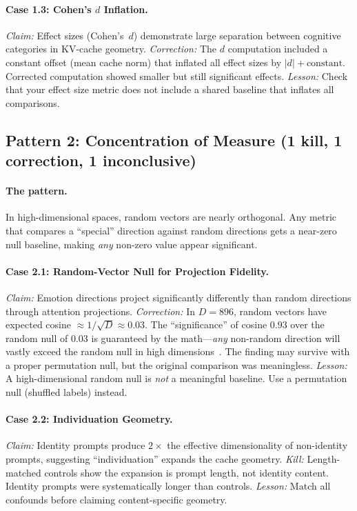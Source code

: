\documentclass[11pt,a4paper]{article}
\begin{document}
\paragraph{Case 1.3: Cohen's $d$ Inflation.}
\emph{Claim:} Effect sizes (Cohen's~$d$) demonstrate large separation
between cognitive categories in KV-cache geometry.
\emph{Correction:} The $d$ computation included a constant offset (mean cache
norm) that inflated all effect sizes by $|d| + \text{constant}$.
Corrected computation showed smaller but still significant effects.
\emph{Lesson:} Check that your effect size metric does not include a
shared baseline that inflates all comparisons.

\subsection{Pattern 2: Concentration of Measure (1 kill, 1 correction, 1 inconclusive)}

\paragraph{The pattern.} In high-dimensional spaces, random vectors are
nearly orthogonal. Any metric that compares a ``special'' direction
against random directions gets a near-zero null baseline, making
\emph{any} non-zero value appear significant.

\paragraph{Case 2.1: Random-Vector Null for Projection Fidelity.}
\emph{Claim:} Emotion directions project significantly differently than
random directions through attention projections.
\emph{Correction:} In $D{=}896$, random vectors have expected cosine
$\approx 1/\sqrt{D} \approx 0.03$. The ``significance'' of cosine
$0.93$ over the random null of $0.03$ is guaranteed by the
math---\emph{any} non-random direction will vastly exceed the random
null in high dimensions~\citep{vershynin2018high}. The finding may
survive with a proper permutation null, but the original comparison was
meaningless.
\emph{Lesson:} A high-dimensional random null is \emph{not} a
meaningful baseline. Use a permutation null (shuffled labels) instead.

\paragraph{Case 2.2: Individuation Geometry.}
\emph{Claim:} Identity prompts produce $2\times$ the effective
dimensionality of non-identity prompts, suggesting ``individuation''
expands the cache geometry.
\emph{Kill:} Length-matched controls show the expansion is prompt
length, not identity content. Identity prompts were systematically
longer than controls.
\emph{Lesson:} Match all confounds before claiming content-specific
geometry.
\end{document}

